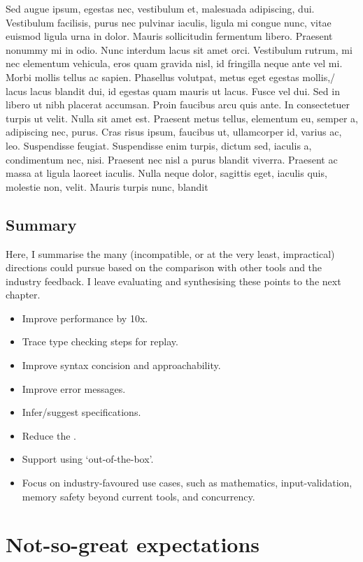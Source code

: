 Sed augue ipsum, egestas nec, vestibulum et, malesuada adipiscing, dui.
Vestibulum facilisis, purus nec pulvinar iaculis, ligula mi congue nunc, vitae
euismod ligula urna in dolor. Mauris sollicitudin fermentum libero. Praesent
nonummy mi in odio. Nunc interdum lacus sit amet orci. Vestibulum rutrum, mi
nec elementum vehicula, eros quam gravida nisl, id fringilla neque ante vel mi.
Morbi mollis tellus ac sapien. Phasellus volutpat, metus eget egestas mollis,/
lacus lacus blandit dui, id egestas quam mauris ut lacus. Fusce vel dui. Sed in
libero ut nibh placerat accumsan. Proin faucibus arcu quis ante. In
consectetuer turpis ut velit. Nulla sit amet est. Praesent metus tellus,
elementum eu, semper a, adipiscing nec, purus. Cras risus ipsum, faucibus ut,
ullamcorper id, varius ac, leo. Suspendisse feugiat. Suspendisse enim turpis,
dictum sed, iaculis a, condimentum nec, nisi. Praesent nec nisl a purus blandit
viverra. Praesent ac massa at ligula laoreet iaculis. Nulla neque dolor,
sagittis eget, iaculis quis, molestie non, velit. Mauris turpis nunc, blandit

\section{Summary}

Here, I summarise the many (incompatible, or at the very least, impractical)
directions  could pursue based on the comparison with other tools
and the industry feedback. I leave evaluating and synthesising these points
to the next chapter.
\begin{itemize}
    \item Improve performance by 10x.
    \item Trace type checking steps for replay.
    \item Improve syntax concision and approachability.
    \item Improve error messages.
    \item Infer/suggest specifications.
    \item Reduce the .
    \item Support using  `out-of-the-box'.
    \item Focus on industry-favoured use cases, such as mathematics,
        input-validation, memory safety beyond current tools, and concurrency.
\end{itemize}

\chapter{Not-so-great expectations}

